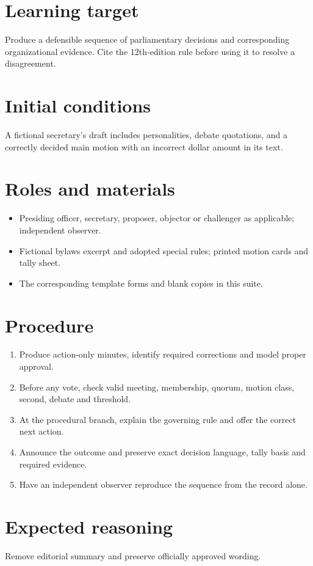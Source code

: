 \documentclass[11pt]{article}
\begin{document}
\SuiteOpen
\section{Learning target}
Produce a defensible sequence of parliamentary decisions and corresponding organizational evidence. Cite the 12th-edition rule before using it to resolve a disagreement.

\section{Initial conditions}
A fictional secretary’s draft includes personalities, debate quotations, and a correctly decided main motion with an incorrect dollar amount in its text.

\section{Roles and materials}
\begin{itemize}[leftmargin=*,itemsep=4pt]
\item Presiding officer, secretary, proposer, objector or challenger as applicable; independent observer.
\item Fictional bylaws excerpt and adopted special rules; printed motion cards and tally sheet.
\item The corresponding template forms and blank copies in this suite.
\end{itemize}

\section{Procedure}
\begin{enumerate}[leftmargin=*,itemsep=4pt]
\item Produce action-only minutes, identify required corrections and model proper approval.
\item Before any vote, check valid meeting, membership, quorum, motion class, second, debate and threshold.
\item At the procedural branch, explain the governing rule and offer the correct next action.
\item Announce the outcome and preserve exact decision language, tally basis and required evidence.
\item Have an independent observer reproduce the sequence from the record alone.
\end{enumerate}

\section{Expected reasoning}
Remove editorial summary and preserve officially approved wording.
\end{document}
